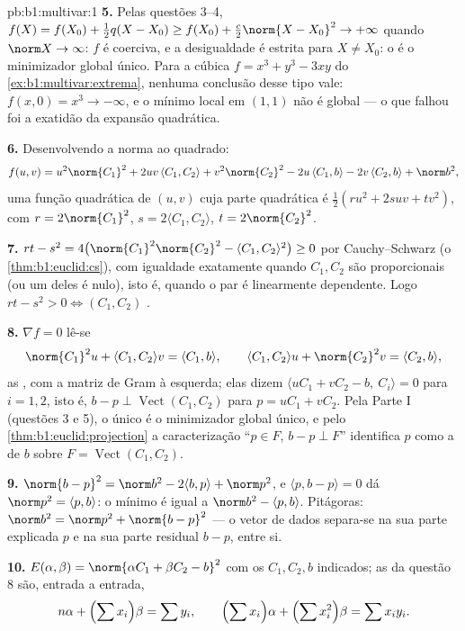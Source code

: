 \begin{solution}{pb:b1:multivar:1}
\textbf{5.} Pelas questões 3--4, $f(X) = f(X_0) + \frac12 q(X -
X_0) \geq f(X_0) + \frac c2\norm{X - X_0}^2 \to +\infty$ quando $\norm X \to \infty$: $f$ é coerciva,
e a desigualdade é estrita para $X \neq X_0$: o  é o
minimizador global único. Para a cúbica $f = x^3 + y^3 - 3xy$ do \cref{ex:b1:multivar:extrema}, nenhuma
conclusão desse tipo vale: $f(x,0)
= x^3 \to -\infty$, e o mínimo local em $(1,1)$ não é
global --- o que falhou foi a exatidão da expansão quadrática.

\textbf{6.} Desenvolvendo a norma ao quadrado:
\[
f(u,v) = u^2\norm{C_1}^2 + 2uv\,\langle C_1, C_2\rangle +
v^2\norm{C_2}^2 - 2u\,\langle C_1, b\rangle - 2v\,\langle C_2,
b\rangle + \norm b^2 ,
\]
uma função quadrática de $(u, v)$ cuja parte quadrática é $\frac12(ru^2 + 2suv + tv^2)$, com
$r = 2\norm{C_1}^2$, $s =
2\langle C_1, C_2\rangle$, $t = 2\norm{C_2}^2$.

\textbf{7.} $rt - s^2 = 4\bigl(\norm{C_1}^2\norm{C_2}^2 -
\langle C_1, C_2\rangle^2\bigr) \geq 0$ por Cauchy--Schwarz (o \cref{thm:b1:euclid:cs}), com igualdade
exatamente quando $C_1, C_2$ são proporcionais (ou um deles é nulo), isto
é, quando o par é linearmente dependente. Logo $rt - s^2 > 0 \iff (C_1, C_2)$ .

\textbf{8.} $\nabla f = 0$ lê-se
\[
\norm{C_1}^2 u + \langle C_1, C_2\rangle v = \langle C_1,
b\rangle,
\qquad
\langle C_1, C_2\rangle u + \norm{C_2}^2 v = \langle C_2,
b\rangle,
\]
as , com a matriz de Gram à esquerda; elas dizem
$\langle uC_1 + vC_2 - b,\ C_i\rangle = 0$ para $i = 1, 2$, isto é, $b - p \perp \operatorname{Vect}(C_1, C_2)$ para $p = uC_1 +
vC_2$. Pela Parte I (questões 3
e 5), o único  é o minimizador global único, e pelo
\cref{thm:b1:euclid:projection} a caracterização ``$p \in F$, $b - p \perp F$'' identifica $p$ como a
 de $b$ sobre $F = \operatorname{Vect}(C_1, C_2)$.

\textbf{9.} $\norm{b - p}^2 = \norm b^2 - 2\langle b, p\rangle +
\norm p^2$, e $\langle p, b - p\rangle = 0$ dá $\norm p^2 =
\langle p, b\rangle$: o mínimo é igual a $\norm b^2 - \langle p,
b\rangle$.
Pitágoras: $\norm b^2 = \norm p^2 + \norm{b - p}^2$ --- o vetor de dados separa-se na sua parte
explicada $p$ e na sua parte residual $b - p$,  entre si.

\textbf{10.} $E(\alpha, \beta) = \norm{\alpha C_1 + \beta C_2 -
b}^2$ com os $C_1, C_2, b$ indicados; as  da
questão 8 são, entrada a entrada,
\[
n\alpha + \Bigl(\sum x_i\Bigr)\beta = \sum y_i,
\qquad
\Bigl(\sum x_i\Bigr)\alpha + \Bigl(\sum x_i^2\Bigr)\beta = \sum
x_i y_i .
\]


\end{solution}
